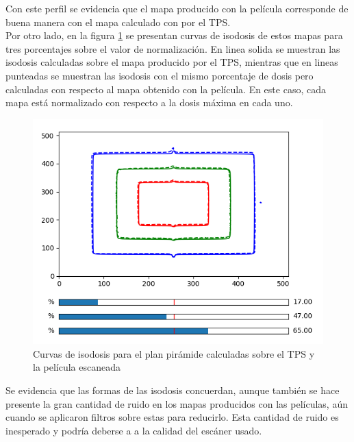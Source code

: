 Con este perfil se evidencia que el mapa producido con la película corresponde de buena manera con el mapa calculado con por el TPS.\\

Por otro lado, en la figura \ref{fig:isodosisPiramide}  se presentan curvas de isodosis de estos mapas para tres porcentajes sobre el valor de normalización. En linea solida se muestran las isodosis calculadas sobre el mapa producido por el TPS, mientras que en lineas punteadas se muestran las isodosis con el mismo porcentaje de dosis pero calculadas con respecto al mapa obtenido con la película. En este caso, cada mapa está normalizado con respecto a la dosis máxima en cada uno. \\ 
\begin{figure}[H]
	\centering
	\includegraphics[width=0.7\linewidth]{images/isodosisPiramide2.png}
	\caption{Curvas de isodosis para el plan pirámide calculadas sobre el TPS y la película escaneada  }
	\label{fig:isodosisPiramide}
\end{figure}

Se evidencia que las formas de las isodosis concuerdan, aunque también se hace presente la gran cantidad de ruido en los mapas producidos con las películas, aún cuando se aplicaron filtros sobre estas para reducirlo. Esta cantidad de ruido es inesperado y podría deberse a a la calidad del escáner usado. \\

